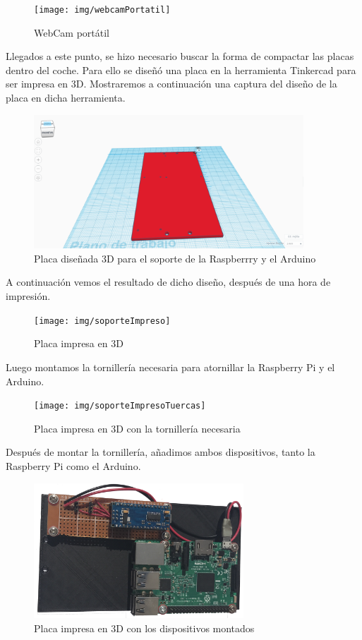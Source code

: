 \documentclass{pclass}
\begin{document}
\begin{itemize}
\begin{figure}[H]
	\centering
	\texttt{[image: img/webcamPortatil]}
	\caption{WebCam portátil}
	\label{fig:webcamportatil}
\end{figure}

Llegados a este punto, se hizo necesario buscar la forma de compactar las placas dentro del coche. Para ello se diseñó una placa en la herramienta Tinkercad para ser impresa en 3D. Mostraremos a continuación una captura del diseño de la placa en dicha herramienta.

\begin{figure}[H]
	\centering
	\includegraphics[width=0.9\textwidth]{img/soportePlacas}
	\caption{Placa diseñada 3D para el soporte de la Raspberrry y el Arduino}
	\label{fig:soporteplacas}
\end{figure}

A continuación vemos el resultado de dicho diseño, después de una hora de impresión.

\begin{figure}[H]
	\centering
	\texttt{[image: img/soporteImpreso]}
	\caption{Placa impresa en 3D}
	\label{fig:soporteplacasimpreso}
\end{figure}

Luego montamos la tornillería necesaria para atornillar la Raspberry Pi y el Arduino.

\begin{figure}[H]
	\centering
	\texttt{[image: img/soporteImpresoTuercas]}
	\caption{Placa impresa en 3D con la tornillería necesaria}
	\label{fig:soporteplacasimpresotuercas}
\end{figure}

Después de montar la tornillería, añadimos ambos dispositivos, tanto la Raspberry Pi como el Arduino.

\begin{figure}[H]
	\centering
	\includegraphics[width=0.7\textwidth]{img/soporteConPlacas}
	\caption{Placa impresa en 3D con los dispositivos montados}
	\label{fig:soporteconplacas}
\end{figure}


\end{itemize}
\end{document}
